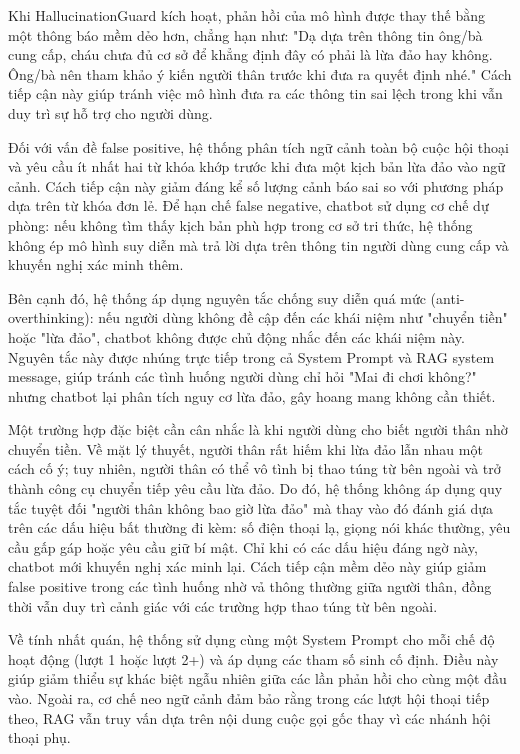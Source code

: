 Khi HallucinationGuard kích hoạt, phản hồi của mô hình được thay thế bằng một thông báo mềm dẻo hơn, chẳng hạn như: "Dạ dựa trên thông tin ông/bà cung cấp, cháu chưa đủ cơ sở để khẳng định đây có phải là lừa đảo hay không. Ông/bà nên tham khảo ý kiến người thân trước khi đưa ra quyết định nhé." Cách tiếp cận này giúp tránh việc mô hình đưa ra các thông tin sai lệch trong khi vẫn duy trì sự hỗ trợ cho người dùng.

Đối với vấn đề false positive, hệ thống phân tích ngữ cảnh toàn bộ cuộc hội thoại và yêu cầu ít nhất hai từ khóa khớp trước khi đưa một kịch bản lừa đảo vào ngữ cảnh. Cách tiếp cận này giảm đáng kể số lượng cảnh báo sai so với phương pháp dựa trên từ khóa đơn lẻ. Để hạn chế false negative, chatbot sử dụng cơ chế dự phòng: nếu không tìm thấy kịch bản phù hợp trong cơ sở tri thức, hệ thống không ép mô hình suy diễn mà trả lời dựa trên thông tin người dùng cung cấp và khuyến nghị xác minh thêm.

Bên cạnh đó, hệ thống áp dụng nguyên tắc chống suy diễn quá mức (anti-overthinking): nếu người dùng không đề cập đến các khái niệm như "chuyển tiền" hoặc "lừa đảo", chatbot không được chủ động nhắc đến các khái niệm này. Nguyên tắc này được nhúng trực tiếp trong cả System Prompt và RAG system message, giúp tránh các tình huống người dùng chỉ hỏi "Mai đi chơi không?" nhưng chatbot lại phân tích nguy cơ lừa đảo, gây hoang mang không cần thiết.

Một trường hợp đặc biệt cần cân nhắc là khi người dùng cho biết người thân nhờ chuyển tiền. Về mặt lý thuyết, người thân rất hiếm khi lừa đảo lẫn nhau một cách cố ý; tuy nhiên, người thân có thể vô tình bị thao túng từ bên ngoài và trở thành công cụ chuyển tiếp yêu cầu lừa đảo. Do đó, hệ thống không áp dụng quy tắc tuyệt đối "người thân không bao giờ lừa đảo" mà thay vào đó đánh giá dựa trên các dấu hiệu bất thường đi kèm: số điện thoại lạ, giọng nói khác thường, yêu cầu gấp gáp hoặc yêu cầu giữ bí mật. Chỉ khi có các dấu hiệu đáng ngờ này, chatbot mới khuyến nghị xác minh lại. Cách tiếp cận mềm dẻo này giúp giảm false positive trong các tình huống nhờ vả thông thường giữa người thân, đồng thời vẫn duy trì cảnh giác với các trường hợp thao túng từ bên ngoài.

Về tính nhất quán, hệ thống sử dụng cùng một System Prompt cho mỗi chế độ hoạt động (lượt 1 hoặc lượt 2+) và áp dụng các tham số sinh cố định. Điều này giúp giảm thiểu sự khác biệt ngẫu nhiên giữa các lần phản hồi cho cùng một đầu vào. Ngoài ra, cơ chế neo ngữ cảnh đảm bảo rằng trong các lượt hội thoại tiếp theo, RAG vẫn truy vấn dựa trên nội dung cuộc gọi gốc thay vì các nhánh hội thoại phụ.


